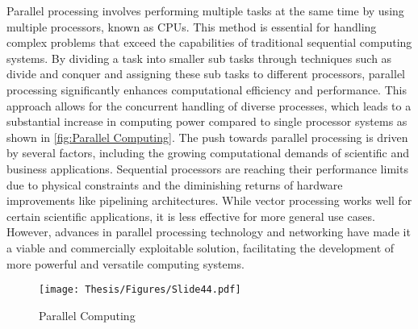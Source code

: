 Parallel processing involves performing multiple tasks at the same time by using multiple processors, known as CPUs. This method is essential for handling complex problems that exceed the capabilities of traditional sequential computing systems. By dividing a task into smaller sub tasks through techniques such as divide and conquer and assigning these sub tasks to different processors, parallel processing significantly enhances computational efficiency and performance. This approach allows for the concurrent handling of diverse processes, which leads to a substantial increase in computing power compared to single processor systems as shown in \autoref{fig:Parallel Computing}. The push towards parallel processing is driven by several factors, including the growing computational demands of scientific and business applications. Sequential processors are reaching their performance limits due to physical constraints and the diminishing returns of hardware improvements like pipelining architectures. While vector processing works well for certain scientific applications, it is less effective for more general use cases. However, advances in parallel processing technology and networking have made it a viable and commercially exploitable solution, facilitating the development of more powerful and versatile computing systems. \cite{buyya2012microkernel}

\captionsetup{justification=centering}
\begin{figure}[h]
\centering
\texttt{[image: Thesis/Figures/Slide44.pdf]}
\caption{\label{fig:Parallel Computing}Parallel Computing \cite{parallel_vs_distributed}}
\end{figure}




